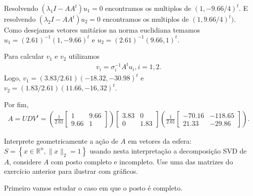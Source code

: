 \begin{questions}
\begin{parts}
\begin{solution}
            Resolvendo $(\lambda_1 I - A A^t) u_1 = 0$ encontramos os multiplos de $(1, -9.66 / 4)^t$. E resolvendo $(\lambda_2 I - A A^t) u_2 = 0$ encontramos os multiplos de $(1, 9.66 / 4)^t)$. Como desejamos vetores unit\'{a}rios na norma euclidiana temamos $u_1 = (2.61)^{-1} (1, -9.66)^t$ e $u_2 = (2.61)^{-1} (9.66, 1)^t$.

            Para calcular $v_1$ e $v_2$ utilizamos
            \begin{align*}
                v_i = \sigma_i^{-1} A^t u_i, i = 1, 2.
            \end{align*}
            Logo, $v_1 = (3.83 / 2.61) (-18.32, -30.98)^t$ e $v_2 = (1.83 / 2.61) (11.66, -16,32)^t$.

            Por fim,
            \begin{align*}
                A = U D V^t = \left( \frac{1}{2.61} \begin{bmatrix}
                    1 & 9.66 \\
                    9.66 & 1
                \end{bmatrix} \right) \begin{bmatrix}
                    3.83 & 0 \\
                    0 & 1.83
                \end{bmatrix} \left( \frac{1}{2.61} \begin{bmatrix}
                    -70.16 & -118.65 \\
                    21.33 & -29.86
                \end{bmatrix} \right).
            \end{align*}
        \end{solution}
    \end{parts}

     Interprete geometricamente a a\c{c}\~{a}o de $A$ em vetores da esfera: $S = \left\{ x \in \mathbb{R}^n, \| x \|_2 = 1 \right\}$ usando nesta interpreta\c{c}\~{a}o a decomposi\c{c}\~{a}o SVD de $A$, considere $A$ com posto completo e incompleto. Use uma das matrizes do exerc\'{i}cio anterior para ilustrar com gr\'{a}ficos.
    \begin{solution}
        Primeiro vamos estudar o caso em que o posto \'{e} completo.


\end{solution}
\end{questions}
